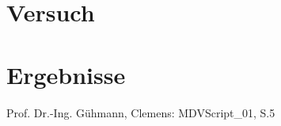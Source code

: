 \begin{quote}
\begin{quote}
    \end{quote}
\end{quote}


\section{Versuch}
\begin{quote}
	
\end{quote}


\section{Ergebnisse}
\begin{quote}
	
\end{quote}


\begin{thebibliography}{999}
 Prof. Dr.-Ing. Gühmann, Clemens: MDVScript\_01, S.5

\end{thebibliography}





